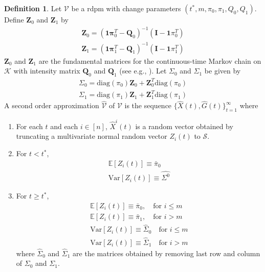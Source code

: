 \documentclass[draftcls]{IEEEtran}
\theoremstyle{definition}
\newtheorem{definition}{Definition}
\begin{document}
\begin{definition}
  \label{def:2}
  Let $\mathscr{V}$ be a rdpm with change parameters $(t^{*}, m,
  \pi_0, \pi_1, Q_0, Q_1)$. Define $\mathbf{Z}_0$ and $\mathbf{Z}_1$
  by
  \begin{gather}
    \mathbf{Z}_0 = (\mathbf{1}\mathbf{\pi}_0^{T} -
    \mathbf{Q}_0)^{-1}(\mathbf{I} - \mathbf{1}\pi_0^{T}) \\
    \mathbf{Z}_1 = (\mathbf{1}\mathbf{\pi}_1^{T} -
    \mathbf{Q}_1)^{-1}(\mathbf{I} - \mathbf{1}\pi_1^{T})
  \end{gather}
  $\mathbf{Z}_0$ and $\mathbf{Z}_1$ are the fundamental matrices
  for the continuous-time Markov chain on $\mathscr{K}$ with intensity
  matrix $\mathbf{Q}_0$ and $\mathbf{Q}_1$ (see
  e.g., \cite[p. 55]{asmussen03:_applied_probab_queues}). Let
  $\Sigma_0$ and $\Sigma_1$ be given by
  \begin{gather*}
    \Sigma_0 = \mathrm{diag}(\pi_0) \mathbf{Z}_0 + \mathbf{Z}_0^{T}
    \mathrm{diag}(\pi_0) \\
    \Sigma_1 = \mathrm{diag}(\pi_1) \mathbf{Z}_1 + \mathbf{Z}_1^{T}
    \mathrm{diag}(\pi_1)
  \end{gather*}
  A second order approximation $\hat{\mathscr{V}}$ of $\mathscr{V}$
  is the sequence $\{\hat{X}(t), \hat{G}(t)\}_{t=1}^{\infty}$ where
  \begin{enumerate}
  \item For each $t$ and each $i \in [n]$, $\hat{X}^{i}(t)$ is a
    random vector obtained by truncating a multivariate normal random
    vector $Z_{i}(t)$ to $\mathscr{S}$.
  \item For $t < t^{*}$,
    \begin{gather}
      \mathbb{E}[Z_i(t)] \equiv \bar{\pi}_0 \\
      \mathrm{Var}[Z_i(t)] \equiv \hat{\Sigma^{0}}
    \end{gather}
  \item For $t \geq t^{*}$,  
    \begin{gather*}
      \mathbb{E}[Z_i(t)] \equiv \bar{\pi}_0, \quad \text{for $i \leq
        m$}  \\
      \mathbb{E}[Z_i(t)] \equiv \bar{\pi}_1, \quad \text{for $i > 
        m$}  \\
      \mathrm{Var}[Z_i(t)] \equiv \hat{\Sigma}_{0} \quad \text{for $i
        \leq m$} \\
      \mathrm{Var}[Z_i(t)] \equiv \hat{\Sigma}_{1} \quad \text{for $i
        > m$}
    \end{gather*}
    where $\hat{\Sigma}_0$ and $\hat{\Sigma}_1$ are the matrices
    obtained by removing last row and column of $\Sigma_0$ and
    $\Sigma_1$. 
  \end{enumerate}
\end{definition}
\end{document}
